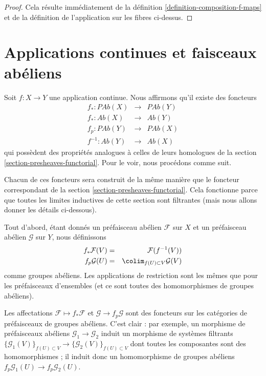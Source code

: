 \begin{proof}
Cela résulte immédiatement de la définition \ref{definition-composition-f-maps}
et de la définition de l'application sur les fibres ci-dessus.
\end{proof}
\section{Applications continues et faisceaux abéliens}
\label{section-abelian-presheaves-functorial}

\noindent
Soit $f : X \to Y$ une application continue.
Nous affirmons qu'il existe des foncteurs
\begin{eqnarray*}
f_* : \textit{PAb}(X) & \longrightarrow & \textit{PAb}(Y) \\
f_* : \textit{Ab}(X) & \longrightarrow & \textit{Ab}(Y) \\
f_p : \textit{PAb}(Y) & \longrightarrow & \textit{PAb}(X) \\
f^{-1} : \textit{Ab}(Y) & \longrightarrow & \textit{Ab}(X)
\end{eqnarray*}
qui possèdent des propriétés analogues à celles de leurs homologues de la
section \ref{section-presheaves-functorial}.
Pour le voir, nous procédons comme suit.

\medskip\noindent
Chacun de ces foncteurs sera construit de la même
manière que le foncteur correspondant de la
section \ref{section-presheaves-functorial}.
Cela fonctionne parce que toutes les limites inductives de cette section
sont filtrantes (mais nous allons donner les détails ci-dessous).

\medskip\noindent
Tout d'abord, étant donnés un préfaisceau abélien $\mathcal{F}$ sur $X$ et
un préfaisceau abélien $\mathcal{G}$ sur $Y$, nous définissons
\begin{eqnarray*}
f_*\mathcal{F}(V) & = & \mathcal{F}(f^{-1}(V)) \\
f_p\mathcal{G}(U) & = & \colim_{f(U) \subset V} \mathcal{G}(V)
\end{eqnarray*}
comme groupes abéliens. Les applications de restriction sont les mêmes que
pour les préfaisceaux d'ensembles (et ce sont
toutes des homomorphismes de groupes abéliens).

\medskip\noindent
Les affectations $\mathcal{F} \mapsto f_*\mathcal{F}$ et
$\mathcal{G} \to f_p\mathcal{G}$ sont des foncteurs sur
les catégories de préfaisceaux de groupes abéliens.
C'est clair : par exemple, un morphisme de préfaisceaux abéliens
$\mathcal{G}_1 \to \mathcal{G}_2$ induit un morphisme de
systèmes filtrants
$\{\mathcal{G}_1(V)\}_{f(U) \subset V} \to
\{\mathcal{G}_2(V)\}_{f(U) \subset V}$
dont toutes les composantes sont des homomorphismes ;
il induit donc un homomorphisme de groupes abéliens
$f_p\mathcal{G}_1(U) \to f_p\mathcal{G}_2(U)$.

